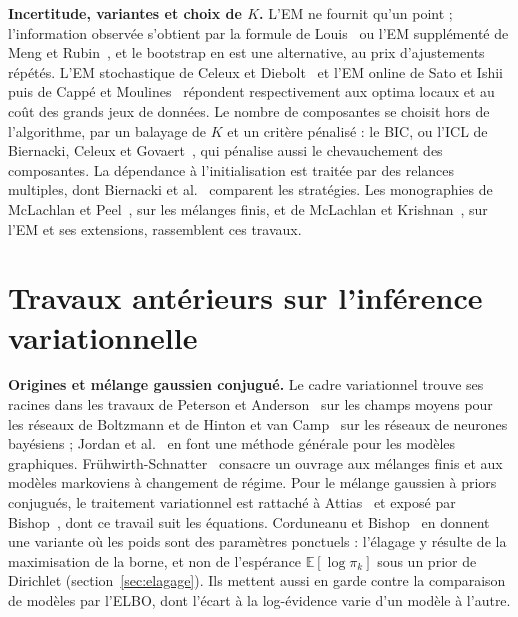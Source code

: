 \textbf{Incertitude, variantes et choix de $K$. }L'EM ne fournit qu'un point ; l'information observée s'obtient par la formule de Louis~\cite{louis1982} ou l'EM supplémenté de Meng et Rubin~\cite{meng1991}, et le bootstrap en est une alternative, au prix d'ajustements répétés. L'EM stochastique de Celeux et Diebolt~\cite{celeux1985} et l'EM online de Sato et Ishii~\cite{sato2000} puis de Cappé et Moulines~\cite{cappe2009} répondent respectivement aux optima locaux et au coût des grands jeux de données. Le nombre de composantes se choisit hors de l'algorithme, par un balayage de $K$ et un critère pénalisé : le BIC, ou l'ICL de Biernacki, Celeux et Govaert~\cite{biernacki2000}, qui pénalise aussi le chevauchement des composantes. La dépendance à l'initialisation est traitée par des relances multiples, dont Biernacki et al.~\cite{biernacki2003} comparent les stratégies. Les monographies de McLachlan et Peel~\cite{mclachlan2000}, sur les mélanges finis, et de McLachlan et Krishnan~\cite{mclachlan2008}, sur l'EM et ses extensions, rassemblent ces travaux.

\section{Travaux antérieurs sur l'inférence variationnelle}\label{sec:ea_vb}
\textbf{Origines et mélange gaussien conjugué. }Le cadre variationnel trouve ses racines dans les travaux de Peterson et Anderson~\cite{peterson1987} sur les champs moyens pour les réseaux de Boltzmann et de Hinton et van Camp~\cite{hinton1993} sur les réseaux de neurones bayésiens ; Jordan et al.~\cite{jordan1999} en font une méthode générale pour les modèles graphiques. Frühwirth-Schnatter~\cite{fruhwirth2006} consacre un ouvrage aux mélanges finis et aux modèles markoviens à changement de régime. Pour le mélange gaussien à priors conjugués, le traitement variationnel est rattaché à Attias~\cite{attias2000} et exposé par Bishop~\cite[section~10.2]{bishop2006}, dont ce travail suit les équations. Corduneanu et Bishop~\cite{corduneanu2001} en donnent une variante où les poids sont des paramètres ponctuels : l'élagage y résulte de la maximisation de la borne, et non de l'espérance $\mathbb{E}[\log \pi_k]$ sous un prior de Dirichlet (section~\ref{sec:elagage}). Ils mettent aussi en garde contre la comparaison de modèles par l'ELBO, dont l'écart à la log-évidence varie d'un modèle à l'autre.


